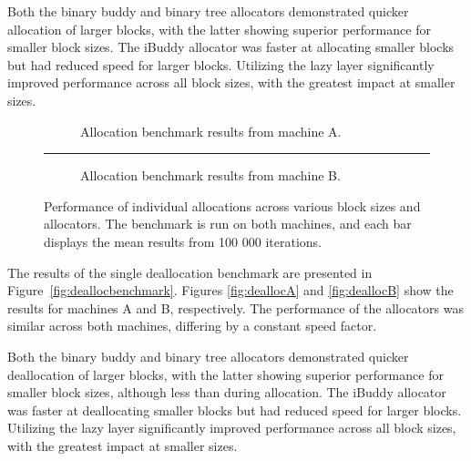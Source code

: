 Both the binary buddy and binary tree allocators demonstrated quicker allocation of larger blocks, with the latter showing superior performance for smaller block sizes. The iBuddy allocator was faster at allocating smaller blocks but had reduced speed for larger blocks. Utilizing the lazy layer significantly improved performance across all block sizes, with the greatest impact at smaller sizes.

\begin{figure}[h]
  \centering
  \begin{subfigure}{\textwidth}
    \centering
    \captionsetup{justification=centering}
    
    \caption{Allocation benchmark results from machine A.}
    \label{fig:allocA}
  \end{subfigure}
  \vspace{-0.5cm}
  \rule{\textwidth}{0.1pt}
  \begin{subfigure}{\textwidth}
    \centering
    \captionsetup{justification=centering}
    
    \caption{Allocation benchmark results from machine B.}
    \label{fig:allocB}
  \end{subfigure}
  \caption{Performance of individual allocations across various block sizes and allocators. The benchmark is run on both machines, and each bar displays the mean results from 100 000 iterations.}
  \label{fig:allocbenchmark}
\end{figure}

\FloatBarrier

The results of the single deallocation benchmark are presented in Figure~\ref{fig:deallocbenchmark}. Figures \ref{fig:deallocA} and \ref{fig:deallocB} show the results for machines A and B, respectively. The performance of the allocators was similar across both machines, differing by a constant speed factor.

Both the binary buddy and binary tree allocators demonstrated quicker deallocation of larger blocks, with the latter showing superior performance for smaller block sizes, although less than during allocation. The iBuddy allocator was faster at deallocating smaller blocks but had reduced speed for larger blocks. Utilizing the lazy layer significantly improved performance across all block sizes, with the greatest impact at smaller sizes.

